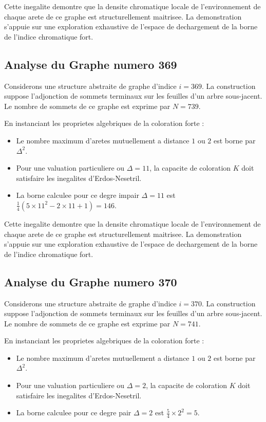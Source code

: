 \documentclass[11pt,a4paper]{article}
\begin{document}
Cette inegalite demontre que la densite chromatique locale de l'environnement de chaque arete de ce graphe est structurellement maitrisee. La demonstration s'appuie sur une exploration exhaustive de l'espace de dechargement de la borne de l'indice chromatique fort.

\subsection{Analyse du Graphe numero 369}
Considerons une structure abstraite de graphe d'indice $i = 369$. La construction suppose l'adjonction de sommets terminaux sur les feuilles d'un arbre sous-jacent. Le nombre de sommets de ce graphe est exprime par $N = 739$.

En instanciant les proprietes algebriques de la coloration forte :
\begin{itemize}
\item Le nombre maximum d'aretes mutuellement a distance $1$ ou $2$ est borne par $\Delta^2$.
\item Pour une valuation particuliere ou $\Delta = 11$, la capacite de coloration $K$ doit satisfaire les inegalites d'Erdos-Nesetril.
\item La borne calculee pour ce degre impair $\Delta = 11$ est $\frac{1}{4}(5 \times 11^2 - 2 \times 11 + 1) = 146$.
\end{itemize}

Cette inegalite demontre que la densite chromatique locale de l'environnement de chaque arete de ce graphe est structurellement maitrisee. La demonstration s'appuie sur une exploration exhaustive de l'espace de dechargement de la borne de l'indice chromatique fort.

\subsection{Analyse du Graphe numero 370}
Considerons une structure abstraite de graphe d'indice $i = 370$. La construction suppose l'adjonction de sommets terminaux sur les feuilles d'un arbre sous-jacent. Le nombre de sommets de ce graphe est exprime par $N = 741$.

En instanciant les proprietes algebriques de la coloration forte :
\begin{itemize}
\item Le nombre maximum d'aretes mutuellement a distance $1$ ou $2$ est borne par $\Delta^2$.
\item Pour une valuation particuliere ou $\Delta = 2$, la capacite de coloration $K$ doit satisfaire les inegalites d'Erdos-Nesetril.
\item La borne calculee pour ce degre pair $\Delta = 2$ est $\frac{5}{4} \times 2^2 = 5$.
\end{itemize}
\end{document}
